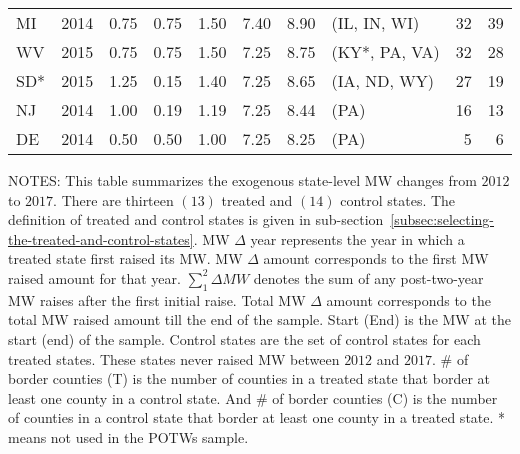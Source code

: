 \begin{table}[H]
{\begin{tabular}{lrrrrrrlrr}
            MI             & 2014             & 0.75               & 0.75                    & 1.50                     & 7.40     & 8.90   & (IL, IN, WI)     & 32                        & 39                        \\
            WV             & 2015             & 0.75               & 0.75                    & 1.50                     & 7.25     & 8.75   & (KY*, PA, VA)     & 32                        & 28                        \\
            SD*     & 2015             & 1.25               & 0.15                    & 1.40                     & 7.25     & 8.65   & (IA, ND, WY)     & 27                        & 19                        \\
            NJ             & 2014             & 1.00               & 0.19                    & 1.19                     & 7.25     & 8.44   & (PA)             & 16                        & 13                        \\
            DE             & 2014             & 0.50               & 0.50                    & 1.00                     & 7.25     & 8.25   & (PA)             & 5                         & 6                         \\ \bottomrule\bottomrule
        \end{tabular}
    }
    \begin{minipage}{17.5cm}
        \vspace{0.01in}
        \tiny NOTES: This table summarizes the exogenous state-level MW changes from $2012$ to $2017$. There are thirteen $(13)$ treated and $(14)$ control states. The definition of treated and control states is given in sub-section~\ref{subsec:selecting-the-treated-and-control-states}. MW $\Delta$ year represents the year in which a treated state first raised its MW. MW $\Delta$ amount corresponds to the first MW raised amount for that year. $\sum_{1}^{2}\Delta MW$ denotes the sum of any post-two-year MW raises after the first initial raise. Total MW $\Delta$ amount corresponds to the total MW raised amount till the end of the sample. Start (End) is the MW at the start (end) of the sample. Control states are the set of control states for each treated states. These states never raised MW between $2012$ and $2017$. \# of border counties (T) is the number of counties in a treated state that border at least one county in a control state. And \# of border counties (C) is the number of counties in a control state that border at least one county in a treated state. * means not used in the POTWs sample.
    \end{minipage}
\end{table}
